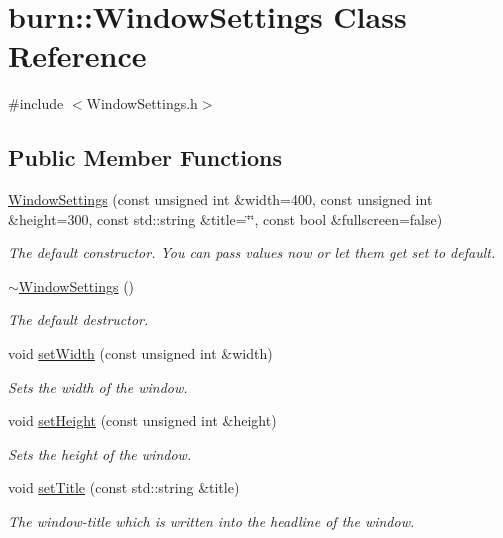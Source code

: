 \hypertarget{classburn_1_1_window_settings}{\section{burn\-:\-:Window\-Settings Class Reference}
\label{classburn_1_1_window_settings}
}


{\ttfamily \#include $<$Window\-Settings.\-h$>$}

\subsection*{Public Member Functions}
\begin{DoxyCompactItemize}
\item 
\hyperlink{classburn_1_1_window_settings_afad87ac1cc0fc38729d5f2d2c073dc58}{Window\-Settings} (const unsigned int \&width=400, const unsigned int \&height=300, const std\-::string \&title=\char`\"{}\char`\"{}, const bool \&fullscreen=false)
\begin{DoxyCompactList}\small\item\em The default constructor. You can pass values now or let them get set to default. \end{DoxyCompactList}\item 
\hyperlink{classburn_1_1_window_settings_a7ce3e5e4cee8bd804519c96e6f35c136}{$\sim$\-Window\-Settings} ()
\begin{DoxyCompactList}\small\item\em The default destructor. \end{DoxyCompactList}\item 
void \hyperlink{classburn_1_1_window_settings_aea8c01713c043323181a49559b223b31}{set\-Width} (const unsigned int \&width)
\begin{DoxyCompactList}\small\item\em Sets the width of the window. \end{DoxyCompactList}\item 
void \hyperlink{classburn_1_1_window_settings_a9fd838b0e2d53de939da4a11aa696700}{set\-Height} (const unsigned int \&height)
\begin{DoxyCompactList}\small\item\em Sets the height of the window. \end{DoxyCompactList}\item 
void \hyperlink{classburn_1_1_window_settings_ab3e290d74fdd3a39bfea8f2b48fd7036}{set\-Title} (const std\-::string \&title)
\begin{DoxyCompactList}\small\item\em The window-\/title which is written into the headline of the window. \end{DoxyCompactList}\item 

\end{DoxyCompactItemize}
